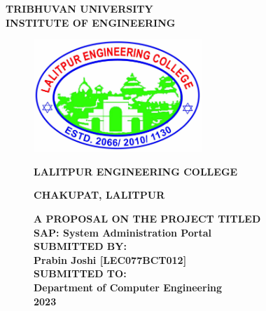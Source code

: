 \begin{center} 
        {\fontsize{14pt}{20}\selectfont \textbf{\MakeUppercase{Tribhuvan University}}}\\
        {\fontsize{14pt}{20}\selectfont \textbf{\MakeUppercase{institute of engineering}}}
        \vspace{0.4in}
\end{center}
\begin{figure}[h]
\centering
    \includegraphics[width = 2.5in]{Proposal/static/LECLogo.jpg}
    \vspace{0.4in}
    \begin{center}
        \vspace{2mm}
        {\fontsize{14pt}{20}\selectfont \textbf{\MakeUppercase{Lalitpur Engineering College}}}
        \vspace{2mm}
        
        {\fontsize{14pt}{5}\selectfont \textbf{\MakeUppercase{Chakupat, lalitpur}}}
    \end{center}
    \vspace{0.4in}
\begin{center}
{\fontsize{14pt}{20}\selectfont \textbf{\MakeUppercase{a proposal on the project titled}}}\\
{\fontsize{14pt}{20}\selectfont \textbf{SAP: System Administration Portal}}\\
\vspace{0.6in}
    {\fontsize{14pt}{20}\selectfont \textbf{\MakeUppercase{submitted by:}}}\\
    {\fontsize{14pt}{20}\selectfont \textbf{Prabin Joshi [LEC077BCT012]}}\\
\vspace{0.6in}
    {\fontsize{14pt}{20}\selectfont \textbf{\MakeUppercase{submitted to:}}}\\
    {\fontsize{14pt}{20}\selectfont \textbf{Department of Computer Engineering}}\\
\vspace{0.6in}
    {\fontsize{14pt}{20}\selectfont \textbf{2023}}\\
\end{center}
\end{figure}
\thispagestyle{empty}
\newpage